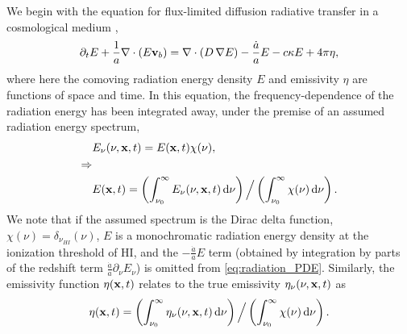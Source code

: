 \documentclass[letterpaper,10pt]{article}
\renewcommand{\(}{\left(}
\renewcommand{\)}{\right)}
\newcommand{\vb}{{\bf v}_b}
\newcommand{\xvec}{{\bf x}}
\begin{document}
We begin with the equation for flux-limited diffusion radiative
transfer in a cosmological medium \cite{ReynoldsHayesPaschosNorman2009},
\begin{equation}
\label{eq:radiation_PDE}
  \partial_{t} E + \frac1a \nabla\cdot\(E\vb\) =
    \nabla\cdot\(D\,\nabla E\) - \frac{\dot{a}}{a} E - c\kappa E + 4\pi\eta,
\end{equation}
where here the comoving radiation energy density $E$ and emissivity
$\eta$ are functions of space and time.  In this equation, the
frequency-dependence of the radiation energy has been integrated away,
under the premise of an assumed radiation energy spectrum,
\begin{align}
  \notag
  & E_{\nu}(\nu,\xvec,t) = E(\xvec,t) \chi(\nu), \\
  \notag
  \Rightarrow & \\
  \label{eq:spectrum}
  & E(\xvec,t) = \(\int_{\nu_0}^{\infty} E_{\nu}(\nu,\xvec,t)\,\mathrm{d}\nu \)
    \Big/ \( \int_{\nu_0}^{\infty} \chi(\nu)\,\mathrm{d}\nu \).
\end{align}
We note that if the assumed spectrum is the Dirac delta function,
$\chi(\nu) = \delta_{\nu_{HI}}(\nu)$, $E$ is a monochromatic radiation
energy density at the ionization threshold of HI, and the
$-\frac{\dot{a}}{a}E$ term (obtained by integration by parts of the
redshift term $\frac{\dot{a}}{a}\partial_{\nu}E_{\nu}$) is omitted
from \eqref{eq:radiation_PDE}. Similarly, the emissivity function 
$\eta(\xvec,t)$ relates to the true emissivity
$\eta_{\nu}(\nu,\xvec,t)$ as  
\begin{equation}
\label{eq:emissivity}
  \eta(\xvec,t) = \( \int_{\nu_0}^{\infty}\eta_{\nu}(\nu,\xvec,t)\,\mathrm{d}\nu \) 
  \Big/ \( \int_{\nu_0}^{\infty}\chi(\nu)\,\mathrm{d}\nu \).
\end{equation}
\end{document}
